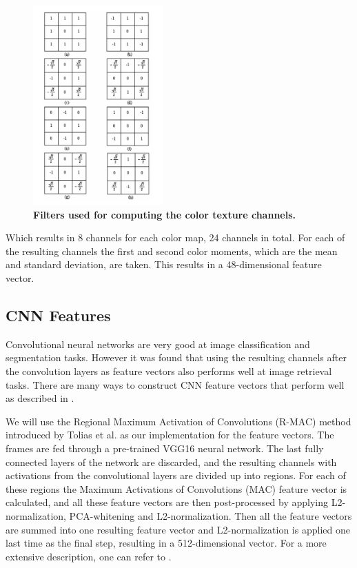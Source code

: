 \documentclass{article}
\begin{document}
\begin{figure}[H]
	\includegraphics[width=5cm]{images/filters.png}
	\centering
	\caption{\textbf{Filters used for computing the color texture channels.}}
	\label{fig:filters}
\end{figure}

Which results in 8 channels for each color map, 24 channels in total. For each of the resulting channels the first and second color moments, which are the mean and standard deviation, are taken. This results in a 48-dimensional feature vector.

\subsection{CNN Features} \label{subsection:cnnfeatures}
Convolutional neural networks are very good at image classification and segmentation tasks. However it was found that using the resulting channels after the convolution layers as feature vectors also performs well at image retrieval tasks. There are many ways to construct CNN feature vectors that perform well as described in \cite{zheng2018sift}.

We will use the Regional Maximum Activation of Convolutions (R-MAC) method introduced by Tolias et al. \cite{tolias2015particular} as our implementation for the feature vectors. The frames are fed through a pre-trained VGG16 neural network. The last fully connected layers of the network are discarded, and the resulting channels with activations from the convolutional layers are divided up into regions. For each of these regions the Maximum Activations of Convolutions (MAC) feature vector is calculated, and all these feature vectors are then post-processed by applying L2-normalization, PCA-whitening and L2-normalization. Then all the feature vectors are summed into one resulting feature vector and L2-normalization is applied one last time as the final step, resulting in a 512-dimensional vector. For a more extensive description, one can refer to \cite{tolias2015particular}.
\end{document}

